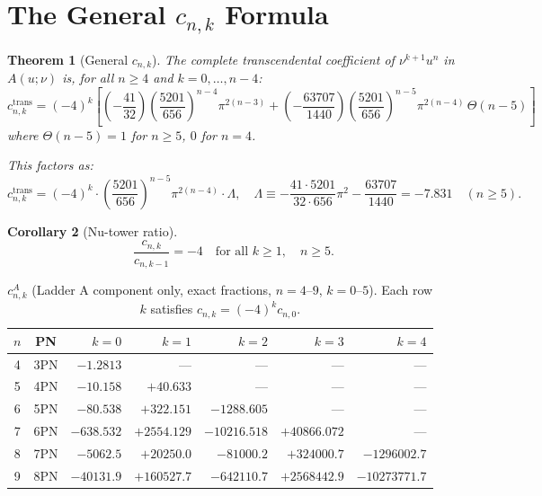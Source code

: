 \documentclass[11pt,a4paper]{article}
\theoremstyle{plain}
\newtheorem{theorem}{Theorem}[section]
\newtheorem{corollary}[theorem]{Corollary}
\theoremstyle{definition}
\theoremstyle{remark}
\begin{document}
\section{The General $c_{n,k}$ Formula}
\label{sec:cnk}

\begin{theorem}[General $c_{n,k}$]\label{thm:cnk}
The complete transcendental coefficient of $\nu^{k+1}u^n$ in $A(u;\nu)$ is,
for all $n\geq4$ and $k=0,\ldots,n-4$:
\begin{equation}
  \boxed{c_{n,k}^{\mathrm{trans}}
    = (-4)^k\!\left[
      \left(-\frac{41}{32}\right)\!\left(\frac{5201}{656}\right)^{\!n-4}\!\pi^{2(n-3)}
      + \left(-\frac{63707}{1440}\right)\!\left(\frac{5201}{656}\right)^{\!n-5}\!\pi^{2(n-4)}\,\Theta(n{-}5)
      \right]}
  \label{eq:cnk}
\end{equation}
where $\Theta(n-5) = 1$ for $n\geq5$, $0$ for $n=4$.

This factors as:
\begin{equation}
  c_{n,k}^{\mathrm{trans}}
    = (-4)^k \!\cdot\! \left(\frac{5201}{656}\right)^{\!n-5}\!\pi^{2(n-4)}
      \cdot \Lambda,
  \quad
  \Lambda \equiv
    -\frac{41\cdot5201}{32\cdot656}\pi^2
    - \frac{63707}{1440}
    = -7.831 \quad (n\geq5).
  \label{eq:Lambda}
\end{equation}
\end{theorem}

\begin{corollary}[Nu-tower ratio]
\begin{equation}
  \frac{c_{n,k}}{c_{n,k-1}} = -4\quad \text{for all } k\geq1,\quad n\geq5.
  \label{eq:nutower_ratio}
\end{equation}
\end{corollary}

\begin{table}[h]
\centering\small
\renewcommand{\arraystretch}{1.25}
\caption{$c_{n,k}^A$ (Ladder A component only, exact fractions, $n=4$--$9$, $k=0$--$5$).
Each row $k$ satisfies $c_{n,k}=(-4)^k c_{n,0}$.}
\label{tab:cnk}
\begin{tabular}{@{}ccrrrrr@{}}
\toprule
$n$ & PN & $k=0$ & $k=1$ & $k=2$ & $k=3$ & $k=4$ \\
\midrule
4 & 3PN & $-1.2813$ & --- & --- & --- & --- \\
5 & 4PN & $-10.158$ & $+40.633$ & --- & --- & --- \\
6 & 5PN & $-80.538$ & $+322.151$ & $-1288.605$ & --- & --- \\
7 & 6PN & $-638.532$ & $+2554.129$ & $-10216.518$ & $+40866.072$ & --- \\
8 & 7PN & $-5062.5$ & $+20250.0$ & $-81000.2$ & $+324000.7$ & $-1296002.7$ \\
9 & 8PN & $-40131.9$ & $+160527.7$ & $-642110.7$ & $+2568442.9$ & $-10273771.7$ \\
\bottomrule
\end{tabular}
\end{table}
\end{document}

